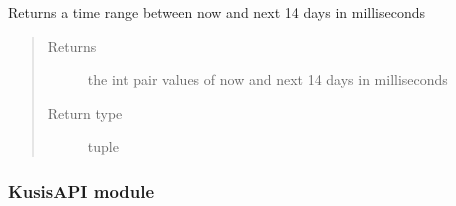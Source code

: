 \documentclass[letterpaper,10pt,english]{sphinxmanual}
\begin{document}

\begin{fulllineitems}
\label{\detokenize{DialogFlow_Bridge_API:DialogFlow_Bridge_API.setBetweenDates}}
\pysigstartsignatures
{}
\pysigstopsignatures
\sphinxAtStartPar
Returns a time range between now and next 14 days in milliseconds
\begin{quote}\begin{description}
\item[{Returns}] \leavevmode
\sphinxAtStartPar
the int pair values of now and next 14 days in milliseconds

\item[{Return type}] \leavevmode
\sphinxAtStartPar
tuple

\end{description}\end{quote}

\end{fulllineitems}


\begin{fulllineitems}
\label{\detokenize{DialogFlow_Bridge_API:DialogFlow_Bridge_API.test}}
\pysigstartsignatures
{}
\pysigstopsignatures
\end{fulllineitems}


\begin{fulllineitems}
\label{\detokenize{DialogFlow_Bridge_API:DialogFlow_Bridge_API.webhook}}
\pysigstartsignatures
{}
\pysigstopsignatures
\end{fulllineitems}


\sphinxstepscope


\subsubsection{KusisAPI module}
\label{\detokenize{KusisAPI:module-KusisAPI}}\label{\detokenize{KusisAPI:kusisapi-module}}\label{\detokenize{KusisAPI::doc}}
\end{document}

